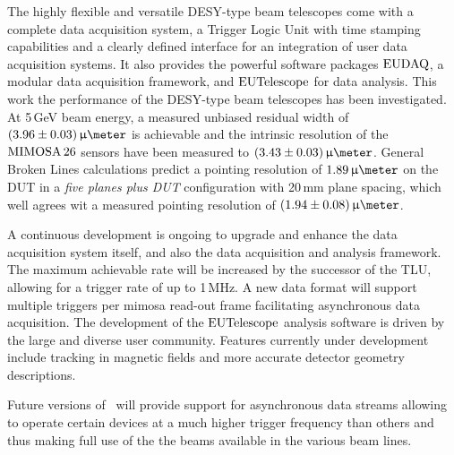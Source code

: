 

The highly flexible and versatile DESY-type beam telescopes come with a complete data acquisition system, a Trigger Logic Unit with time stamping capabilities
 and a clearly defined interface for an integration of user data acquisition systems.
It also provides the powerful software packages $\textrm{EUDAQ}$, a modular data acquisition framework, and $\textrm{EUTelescope}$ for data analysis. 
This work the performance of the  DESY-type beam telescopes has been investigated. 
At 5\,GeV beam energy, a measured unbiased residual width of $(3.96 \pm 0.03)\,\upmu\meter$ is achievable
 and the intrinsic resolution of the $\textrm{MIMOSA\,26}$ sensors have been measured to $(3.43 \pm 0.03)\,\upmu\meter$.
General Broken Lines calculations predict a pointing resolution of $1.89\,\upmu\meter$ on the DUT in a \textit{five planes plus DUT} configuration with 20\,mm plane spacing,
 which well agrees wit a measured pointing resolution of $(1.94 \pm 0.08)\,\upmu\meter$.

A continuous development is ongoing to upgrade and enhance the data acquisition system itself, and also the data acquisition and analysis framework.  
The maximum achievable rate will be increased by the successor of the TLU, allowing for a trigger rate of up to 1\,MHz.
 A new data format will support multiple triggers per mimosa read-out frame facilitating asynchronous data acquisition. 
The development of the $\textrm{EUTelescope}$ analysis software is driven by the large and diverse user community. 
Features currently under development include tracking in magnetic fields and more accurate detector geometry descriptions. 

Future versions of \eudaq\ will provide support for asynchronous data streams allowing to operate certain devices at a much higher trigger frequency than others
 and thus making full use of the the beams available in the various beam lines.

